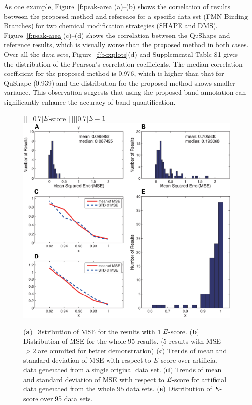 As one example, Figure~\ref{f:peak-area}(a)--(b) shows the correlation of results between the proposed method and reference for a specific data set (FMN Binding Branches) for two chemical modification strategies (SHAPE and DMS). Figure~\ref{f:peak-area}(c)--(d) shows the correlation between the QuShape and reference results, which is visually worse than the proposed method in both cases. Over all the data sets, Figure~\ref{f:boxplots}(d) and Supplemental Table S1 gives the distribution of the Pearson's correlation coefficients. The median correlation coefficient for the proposed method is 0.976, which is higher than that for QuShape (0.939) and the distribution for the proposed method shows smaller variance. This observation suggests that using the proposed band annotation can significantly enhance the accuracy of band quantification. 


\begin{figure}
\centering
	[][][0.7]{${\emph{E}}$-score}
	[][][0.7]{${\emph{E}}=1$}
\includegraphics[width=0.9\linewidth]{figures/result_escore_mse4}
\caption{(\textbf{a}) Distribution of MSE for the results with 1 ${\emph{E}}$-score. (\textbf{b}) Distribution of MSE for the whole 95 results. (5 results with MSE $> 2$ are ommited for better demonstration) (\textbf{c}) Trends of mean and standard deviation of MSE with respect to ${\emph{E}}$-score over artificial data generated from a single original data set. (\textbf{d}) Trends of mean and standard deviation of MSE with respect to ${\emph{E}}$-score for artificial data generated from the whole 95 data sets. (\textbf{e}) Distribution of ${\emph{E}}$-score over 95 data sets.}
\label{f:escore-mse}
\end{figure}

